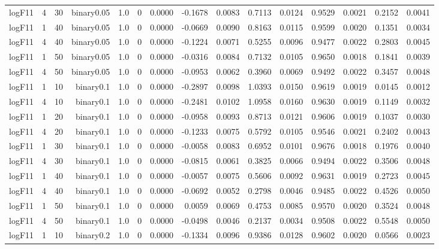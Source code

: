 \begin{longtable}{rrrrrrrrrrrrrrr}
  logF11 & 4 & 30 & binary0.05 & 1.0 & 0 & 0.0000 & -0.1678 & 0.0083 & 0.7113 & 0.0124 & 0.9529 & 0.0021 & 0.2152 & 0.0041 \\ 
  logF11 & 1 & 40 & binary0.05 & 1.0 & 0 & 0.0000 & -0.0669 & 0.0090 & 0.8163 & 0.0115 & 0.9599 & 0.0020 & 0.1351 & 0.0034 \\ 
  logF11 & 4 & 40 & binary0.05 & 1.0 & 0 & 0.0000 & -0.1224 & 0.0071 & 0.5255 & 0.0096 & 0.9477 & 0.0022 & 0.2803 & 0.0045 \\ 
  logF11 & 1 & 50 & binary0.05 & 1.0 & 0 & 0.0000 & -0.0316 & 0.0084 & 0.7132 & 0.0105 & 0.9650 & 0.0018 & 0.1841 & 0.0039 \\ 
  logF11 & 4 & 50 & binary0.05 & 1.0 & 0 & 0.0000 & -0.0953 & 0.0062 & 0.3960 & 0.0069 & 0.9492 & 0.0022 & 0.3457 & 0.0048 \\ 
  logF11 & 1 & 10 & binary0.1 & 1.0 & 0 & 0.0000 & -0.2897 & 0.0098 & 1.0393 & 0.0150 & 0.9619 & 0.0019 & 0.0145 & 0.0012 \\ 
  logF11 & 4 & 10 & binary0.1 & 1.0 & 0 & 0.0000 & -0.2481 & 0.0102 & 1.0958 & 0.0160 & 0.9630 & 0.0019 & 0.1149 & 0.0032 \\ 
  logF11 & 1 & 20 & binary0.1 & 1.0 & 0 & 0.0000 & -0.0958 & 0.0093 & 0.8713 & 0.0121 & 0.9606 & 0.0019 & 0.1037 & 0.0030 \\ 
  logF11 & 4 & 20 & binary0.1 & 1.0 & 0 & 0.0000 & -0.1233 & 0.0075 & 0.5792 & 0.0105 & 0.9546 & 0.0021 & 0.2402 & 0.0043 \\ 
  logF11 & 1 & 30 & binary0.1 & 1.0 & 0 & 0.0000 & -0.0058 & 0.0083 & 0.6952 & 0.0101 & 0.9676 & 0.0018 & 0.1976 & 0.0040 \\ 
  logF11 & 4 & 30 & binary0.1 & 1.0 & 0 & 0.0000 & -0.0815 & 0.0061 & 0.3825 & 0.0066 & 0.9494 & 0.0022 & 0.3506 & 0.0048 \\ 
  logF11 & 1 & 40 & binary0.1 & 1.0 & 0 & 0.0000 & -0.0057 & 0.0075 & 0.5606 & 0.0092 & 0.9631 & 0.0019 & 0.2723 & 0.0045 \\ 
  logF11 & 4 & 40 & binary0.1 & 1.0 & 0 & 0.0000 & -0.0692 & 0.0052 & 0.2798 & 0.0046 & 0.9485 & 0.0022 & 0.4526 & 0.0050 \\ 
  logF11 & 1 & 50 & binary0.1 & 1.0 & 0 & 0.0000 & 0.0059 & 0.0069 & 0.4753 & 0.0085 & 0.9570 & 0.0020 & 0.3524 & 0.0048 \\ 
  logF11 & 4 & 50 & binary0.1 & 1.0 & 0 & 0.0000 & -0.0498 & 0.0046 & 0.2137 & 0.0034 & 0.9508 & 0.0022 & 0.5548 & 0.0050 \\ 
  logF11 & 1 & 10 & binary0.2 & 1.0 & 0 & 0.0000 & -0.1334 & 0.0096 & 0.9386 & 0.0128 & 0.9602 & 0.0020 & 0.0566 & 0.0023 \\ 

\end{longtable}

